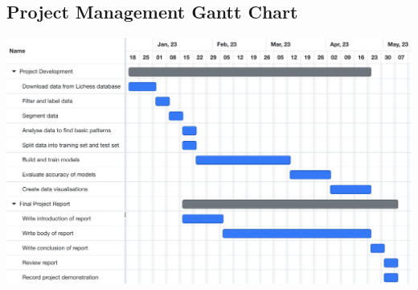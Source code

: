 \documentclass[%
 superscriptaddress,
showpacs,preprintnumbers,
 amsmath,
 amssymb,
 aps,
 pra,
showkeys,
onecolumn,
notitlepage,
11pt,
tightenlines      %
]{revtex4-1}
\begin{document}
\newpage



\begin{appendices}
    \section{Project Management Gantt Chart}
    \begin{center}
        \includegraphics[width=1\textwidth]{images/Gantt Chart - Project Management.png}
    \end{center}
\end{appendices}
\end{document}
